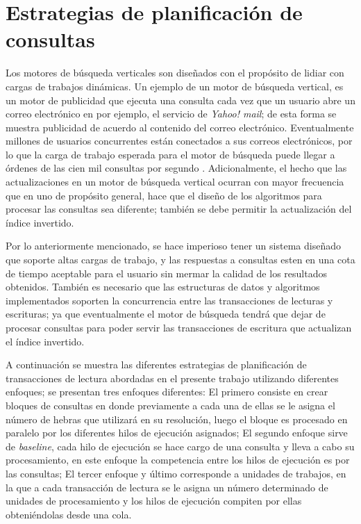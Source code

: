 \chapter{Estrategias de planificación de consultas}
\label{cap:planificacion}
Los motores de búsqueda verticales son diseñados con el propósito de lidiar con cargas de trabajos dinámicas. Un ejemplo de un motor de búsqueda vertical, es un motor de publicidad que ejecuta una consulta cada vez que un usuario abre un correo electrónico en por ejemplo, el servicio de \textit{Yahoo! mail}; de esta forma se muestra publicidad de acuerdo al contenido del correo electrónico. Eventualmente millones de usuarios concurrentes están conectados a sus correos electrónicos, por lo que la carga de trabajo esperada para el motor de búsqueda puede llegar a órdenes de las cien mil consultas por segundo \citep{Gil-Costa:2013}. Adicionalmente, el hecho que las actualizaciones en un motor de búsqueda vertical ocurran con mayor frecuencia que en uno de propósito general, hace que el diseño de los algoritmos para procesar las consultas sea diferente; también se debe permitir la actualización del índice invertido.

Por lo anteriormente mencionado, se hace imperioso tener un sistema diseñado que soporte altas cargas de trabajo, y las respuestas a consultas esten en una cota de tiempo aceptable para el usuario sin mermar la calidad de los resultados obtenidos. También es necesario que las estructuras de datos y algoritmos implementados soporten la concurrencia entre las transacciones de lecturas y escrituras; ya que eventualmente el motor de búsqueda tendrá que dejar de procesar consultas para poder servir las transacciones de escritura que actualizan el índice invertido.

A continuación se muestra las diferentes estrategias de planificación de transacciones de lectura abordadas en el presente trabajo utilizando diferentes enfoques; se presentan tres enfoques diferentes: El primero consiste en crear bloques de consultas en donde previamente a cada una de ellas se le asigna el número de hebras que utilizará en su resolución, luego el bloque es procesado en paralelo por los diferentes hilos de ejecución asignados; El segundo enfoque sirve de \textit{baseline}, cada hilo de ejecución se hace cargo de una consulta y lleva a cabo su procesamiento, en este enfoque la competencia entre los hilos de ejecución es por las consultas; El tercer enfoque y último corresponde a unidades de trabajos, en la que a cada transacción de lectura se le asigna un número determinado de unidades de procesamiento y los hilos de ejecución compiten por ellas obteniéndolas desde una cola.


